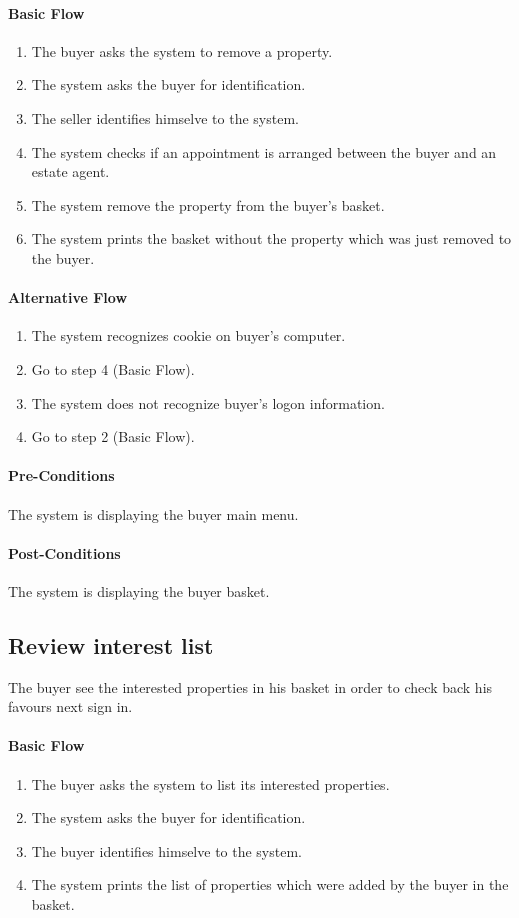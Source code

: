 \documentclass[a4paper,12pt]{article}
\begin{document}
\paragraph{Basic Flow}
\begin{enumerate}
\item The buyer asks the system to remove a property.
\item The system asks the buyer for identification.
\item The seller identifies himselve to the system.
\item The system checks if an appointment is arranged between the buyer and an estate agent.
\item The system remove the property from the buyer's basket.
\item The system prints the basket without the property which was just removed to the buyer.
\end{enumerate}
\paragraph{Alternative Flow}
\begin{enumerate}
\item The system recognizes cookie on buyer's computer. 
\item Go to step 4 (Basic Flow).
\item The system does not recognize buyer's logon information.
\item Go to step 2 (Basic Flow).
\end{enumerate}
\paragraph{Pre-Conditions}
The system is displaying the buyer main menu.
\paragraph{Post-Conditions}
The system is displaying the buyer basket.

\subsection{Review interest list}
The buyer see the interested properties in his basket in order to check back his favours next sign in.
\paragraph{Basic Flow}
\begin{enumerate}
\item The buyer asks the system to list its interested properties.
\item The system asks the buyer for identification.
\item The buyer identifies himselve to the system.
\item The system prints the list of properties which were added by the buyer in the basket.
\end{enumerate}
\end{document}
